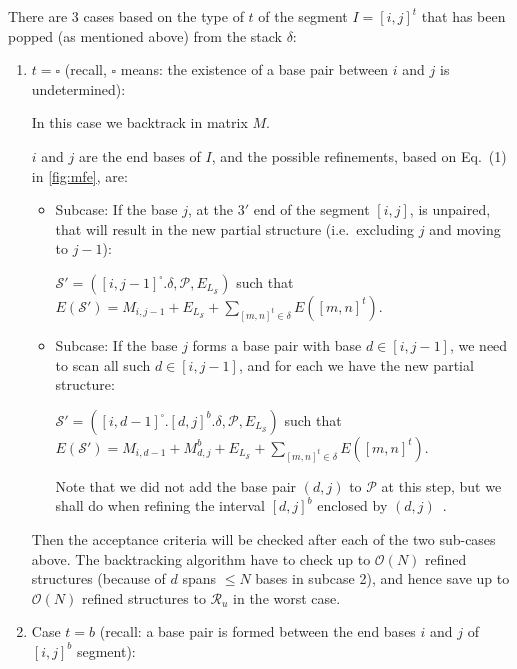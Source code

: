 \documentclass[11pt,letterpaper]{article}  \usepackage[margin=1in]{geometry}
\theoremstyle{definition}  \newtheorem{Definition}[theorem]{Definition}
\begin{document}
There are $3$ cases based on the type of $t$ of the segment $I = [i,j]^t$ that has been popped (as mentioned above) from the stack $\delta$:



\begin{enumerate}\item
	$t = \square$ (recall, $\square$ means: the existence of a base pair between $i$ and $j$ is undetermined): 
	
	In this case we backtrack in matrix $M$.  
	
	$i$ and $j$ are the end bases of $I$, and the possible refinements, based on Eq.~(1) in \cref{fig:mfe}, are: 
	
	\begin{itemize}
		\item Subcase: If the base $j$, at the $3'$ end of the segment $[i,j]$, is unpaired, that will result in the new partial structure (i.e.~excluding $j$ and moving to $j-1$):
		
		$\mathcal{S}' = ([i,j-1]^\square.\delta, \mathcal{P}, E_{L_{\mathcal{S}}})$ such that $E(\mathcal{S}') = M_{i,j-1} + E_{L_{\mathcal{S}}} 
		+ \sum \limits_{[m,n]^t \in \delta} E([m,n]^t)$.
		
		\item 	Subcase: If the base $j$ forms a base pair with base $d \in [i,j-1]$,  we need to scan all such  $d \in [i,j-1]$, 
		and for each we have the new partial structure:
		
		$\mathcal{S}' = ([i,d-1]^\square.[d,j]^b.\delta, \mathcal{P}, E_{L_{\mathcal{S}}})$ such that $E(\mathcal{S}') = M_{i,d-1} + M^b_{d,j}  +E_{L_{\mathcal{S}}} 
		+ \sum \limits_{[m,n]^t \in \delta} E([m,n]^t)$. 
		
		Note that we did not add the base pair $(d,j)$ to $\mathcal{P}$ at this step, but we shall do when refining the interval
		$[d,j]^b$ enclosed by $(d,j)$~\cite{wuchty1999complete}. 	
	\end{itemize}
	
	Then the acceptance criteria will be checked after each of the two sub-cases above. The backtracking algorithm have to  check up to $\mathcal{O}(N)$ refined structures (because of $d$ spans $\leq N$ bases in subcase 2), and hence save up to  $\mathcal{O}(N)$ refined structures to $\mathcal{R}_u$ in the worst case.   
	
	\item
	Case $t = b$ (recall: a base pair is formed between the end bases $i$ and $j$ of $[i,j]^b$ segment):
	

\end{enumerate}
\end{document}
